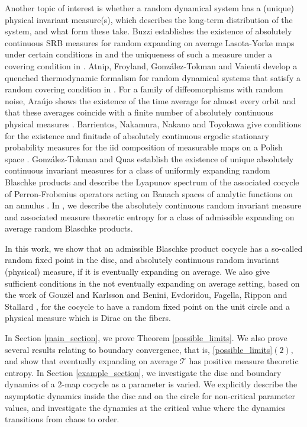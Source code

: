 \documentclass[12pt,reqno]{amsart}
\numberwithin{theorem}{section}
\begin{document}
Another topic of interest is whether a random dynamical system has a (unique) physical invariant measure(s), which describes the long-term distribution of the system,  and what form these take. Buzzi establishes the existence of absolutely continuous SRB measures for random expanding on average Lasota-Yorke maps under certain conditions in \cite{buzzi_SRB} and the uniqueness of such a measure under a covering condition in \cite{buzzi_edoc}. Atnip, Froyland, González-Tokman and Vaienti develop a quenched thermodynamic formalism for random dynamical systems that satisfy a random covering condition in \cite{AFGV2}. For a family of diffeomorphisms with random noise, Araújo shows the existence of the time average for almost every orbit and that these averages coincide with a finite number of absolutely continuous physical measures \cite{araujo_time_average}. Barrientos, Nakamura, Nakano and Toyokawa give conditions for the existence and finitude of absolutely continuous ergodic stationary probability measures for the iid composition of measurable maps on a Polish space \cite{finititude_physical_measure}. González-Tokman and Quas establish the existence of unique absolutely continuous invariant measures for a class of uniformly expanding random Blaschke products and describe the Lyapunov spectrum of the associated cocycle of Perron-Frobenius
operators acting on Banach spaces of analytic functions on an annulus \cite{CGTAQ}. In \cite{preprint}, we describe the absolutely continuous random invariant measure and associated measure theoretic entropy for a class of admissible expanding on average random Blaschke products.

 In this work, we show that an admissible Blaschke product cocycle has a so-called random fixed point in the disc, and absolutely continuous random invariant (physical) measure, if it is eventually expanding on average. We also give sufficient conditions in the not eventually expanding on average setting, based on the work of Gouzël and Karlsson \cite{subadditive_MET} and Benini, Evdoridou, Fagella, Rippon and Stallard \cite{benini_1}, for the cocycle to have a random fixed point on the unit circle and a physical measure which is Dirac on the fibers. 

 In Section \ref{main_section}, we prove Theorem \ref{possible_limits}. We also prove several results relating to boundary convergence, that is, \ref{possible_limits}$(2),$ and show that eventually expanding on average $\mathcal{T}$ has positive measure theoretic entropy. In Section \ref{example_section}, we investigate the disc and boundary dynamics of a 2-map cocycle as a parameter is varied. We explicitly describe the asymptotic dynamics inside the disc and on the circle for non-critical parameter values, and investigate the dynamics at the critical value where the dynamics transitions from chaos to order.
\end{document}
